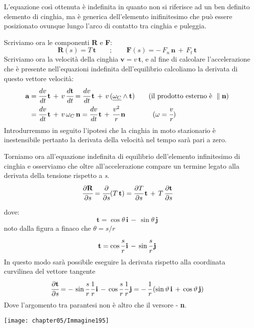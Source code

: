 L'equazione così ottenuta è indefinita in quanto non si riferisce ad un ben definito elemento di cinghia, ma è generica dell'elemento inifinitesimo che può essere posizionato ovunque lungo l'arco di contatto tra cinghia e puleggia.

Scriviamo ora le componenti \textbf{R} e \textbf{F}:
\[\mathbf{R}(s) = T\,\mathbf{t}\qquad;\qquad \mathbf{F}(s) = -\,F_n\,\mathbf{n}\,+\,F_t\,\mathbf{t}\]
Scriviamo ora la velocità della cinghia $\mathbf{v} = v\,\mathbf{t}$, e al fine di calcolare l'accelerazione che è presente nell'equazioni indefinita dell'equilibrio calcoliamo la derivata di questo vettore velocità:
\begin{align*}
\mathbf{a} &= \cfrac{dv}{dt}\,\mathbf{t}\,+\,v\,\cfrac{d\mathbf{t}}{dt} = \cfrac{dv}{dt}\,\mathbf{t} \,+\,v\,(\underline{\omega_C}\wedge\mathbf{t})\qquad (\text{il prodotto esterno è }\parallel \mathbf{n})\\
&= \cfrac{dv}{dt}\,\mathbf{t}\,+\,v\,\omega_C\,\mathbf{n} = \cfrac{dv}{dt}\,\mathbf{t}\,+\,\cfrac{v^2}{r}\,\mathbf{n}\qquad\qquad(\omega = \cfrac{v}{r})
\end{align*}
Introdurremmo in seguito l'ipotesi che la cinghia in moto stazionario è inestensibile pertanto la derivata della velocità nel tempo sarà pari a zero.

Torniamo ora all'equazione indefinita di equilibrio dell'elemento infinitesimo di cinghia e osserviamo che oltre all'accelerazione compare un termine legato alla derivata della tensione rispetto a \emph{s}.
\[\cfrac{\partial\mathbf{R}}{\partial s} = \cfrac{\partial}{\partial s}(T\,\mathbf{t}) = \cfrac{\partial T}{\partial s}\,\mathbf{t}\,+\,T\,\cfrac{\partial\mathbf{t}}{\partial s}\]

\begin{minipage}{.5\textwidth}
dove:
\[\mathbf{t} = \cos{\theta}\,\mathbf{i}\,-\,\sin{\theta}\,\mathbf{j}\]
noto dalla figura a finaco che $\theta = s/r$
\[\mathbf{t} = \cos{\cfrac{s}{r}}\,\mathbf{i}\,-\,\sin{\cfrac{s}{r}}\,\mathbf{j}\]
In questo modo sarà possibile eseguire la derivata rispetto alla coordinata curvilinea del vettore tangente
\[\cfrac{\partial\mathbf{t}}{\partial s} = -\,\sin{\cfrac{s}{r}}\,\cfrac{1}{r}\,\mathbf{i}\,-\,\cos{\cfrac{s}{r}}\,\cfrac{1}{r}\,\mathbf{j} = -\,\cfrac{1}{r}\,(\sin{\vartheta}\,\mathbf{i}\,+\,\cos{\vartheta}\,\mathbf{j})\]
Dove l'argomento tra parantesi non è altro che il versore - \textbf{n}.
\end{minipage}
\hfill
\begin{minipage}{.5\textwidth}
\centering
\texttt{[image: chapter05/Immagine195]}
\end{minipage}

